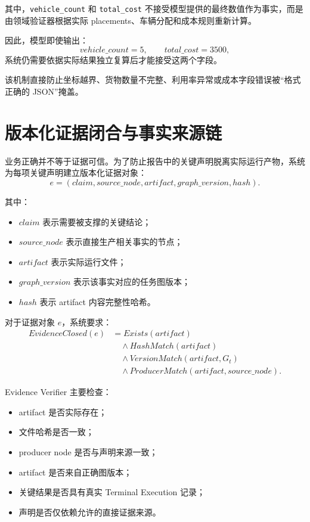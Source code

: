 \documentclass[UTF8,a4paper,12pt,oneside]{ctexbook}
\begin{document}
其中，\texttt{vehicle\_count} 和 \texttt{total\_cost} 不接受模型提供的最终数值作为事实，而是由领域验证器根据实际 placements、车辆分配和成本规则重新计算。

因此，模型即使输出：
\[
vehicle\_count=5,\qquad total\_cost=3500,
\]
系统仍需要依据实际结果独立复算后才能接受这两个字段。

该机制直接防止坐标越界、货物数量不完整、利用率异常或成本字段错误被“格式正确的 JSON”掩盖。


\section{版本化证据闭合与事实来源链}

业务正确并不等于证据可信。为了防止报告中的关键声明脱离实际运行产物，系统为每项关键声明建立版本化证据对象：
\[
e=
(
claim,
source\_node,
artifact,
graph\_version,
hash
).
\]

其中：

\begin{itemize}
    \item $claim$ 表示需要被支撑的关键结论；
    \item $source\_node$ 表示直接生产相关事实的节点；
    \item $artifact$ 表示实际运行文件；
    \item $graph\_version$ 表示该事实对应的任务图版本；
    \item $hash$ 表示 artifact 内容完整性哈希。
\end{itemize}

对于证据对象 $e$，系统要求：
\[
\begin{aligned}
EvidenceClosed(e)
&= Exists(artifact) \\[3pt]
&\quad \land HashMatch(artifact) \\[3pt]
&\quad \land VersionMatch(artifact,G_t) \\[3pt]
&\quad \land ProducerMatch(artifact,source\_node).
\end{aligned}
\]

Evidence Verifier 主要检查：

\begin{itemize}
    \item artifact 是否实际存在；
    \item 文件哈希是否一致；
    \item producer node 是否与声明来源一致；
    \item artifact 是否来自正确图版本；
    \item 关键结果是否具有真实 Terminal Execution 记录；
    \item 声明是否仅依赖允许的直接证据来源。
\end{itemize}
\end{document}
